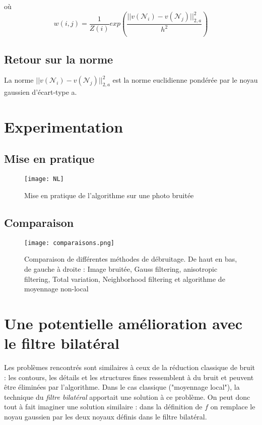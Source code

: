 \documentclass{article}
\begin{document}
où $$w(i,j) = \frac{1}{Z(i)}exp(\frac{||v(\mathcal{N}_i)-v(\mathcal{N}_{j})||_{2,a}^{2}}{h^{2}})$$
\subsection{Retour sur la norme}
La norme $||v(\mathcal{N}_{i})-v(\mathcal{N}_j)||_{2,a}^{2}$ est la norme euclidienne pondérée par le noyau gaussien d'écart-type a.



\section{Experimentation}
\subsection{Mise en pratique}
\begin{figure}[ht!]
    \centering
    \texttt{[image: NL]}
    \caption{Mise en pratique de l'algorithme sur une photo bruitée}
\end{figure}

\subsection{Comparaison}
\begin{figure}[ht!]
    \centering
    \texttt{[image: comparaisons.png]}
    \caption{Comparaison de différentes méthodes de débruitage. De haut en bas, de gauche à droite : Image bruitée, Gauss filtering, anisotropic filtering, Total variation, Neighborhood filtering et algorithme de moyennage non-local}
\end{figure}

\section{Une potentielle amélioration avec le filtre bilatéral}
Les problèmes rencontrés sont similaires à ceux de la réduction classique de bruit : les contours, les détails et les structures fines ressemblent à du bruit et peuvent être éliminées par l'algorithme. Dans le cas classique ("moyennage local"), la technique du \textit{filtre bilatéral} apportait une solution à ce problème. On peut donc tout à fait imaginer une solution similaire : dans la définition de $f$ on remplace le noyau gaussien par les deux noyaux définis dans le filtre bilatéral.  
\end{document}
